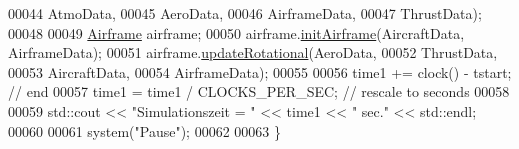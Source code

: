 \begin{DoxyCode}
00044                                     AtmoData,
00045                                     AeroData,
00046                                     AirframeData,
00047                                     ThrustData);
00048 
00049         \hyperlink{group___airframe_class_airframe}{Airframe} airframe;
00050         airframe.\hyperlink{group___airframe_a57b5f7a74d11723186f34fc183e1581b}{initAirframe}(AircraftData, AirframeData);
00051         airframe.\hyperlink{group___airframe_af506bca34fa40f9ec0613b3be8f726eb}{updateRotational}(AeroData,
00052                                     ThrustData,
00053                                     AircraftData,
00054                                     AirframeData);
00055 
00056     time1 += clock() - tstart;     \textcolor{comment}{// end}
00057     time1 = time1 / CLOCKS\_PER\_SEC;  \textcolor{comment}{// rescale to seconds}
00058 
00059     std::cout << \textcolor{stringliteral}{"Simulationszeit = "} << time1 << \textcolor{stringliteral}{" sec."} << std::endl;
00060 
00061     system(\textcolor{stringliteral}{"Pause"});
00062 
00063 \}
\end{DoxyCode}

